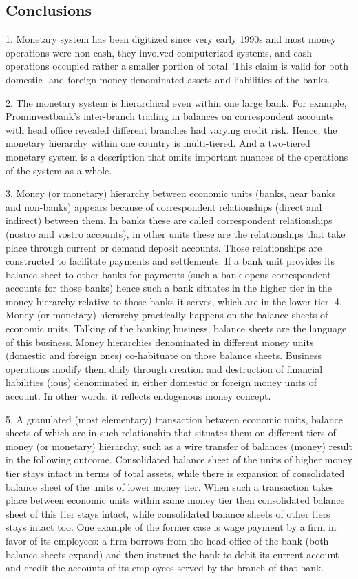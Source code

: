 \subsection{Conclusions}

1. Monetary system has been digitized since very early 1990s and most money operations were non-cash, they involved computerized systems, and cash operations occupied rather a smaller portion of total. This claim is valid for both domestic- and foreign-money denominated assets and liabilities of the banks.

2. The monetary system is hierarchical even within one large bank. For example, Prominvestbank's inter-branch trading in balances on correspondent accounts with head office revealed different branches had varying credit risk. Hence, the monetary hierarchy within one country is multi-tiered. And a two-tiered monetary system is a description that omits important nuances of the operations of the system as a whole.

3. Money (or monetary) hierarchy between economic units (banks, near banks and non-banks) appears because of correspondent relationships (direct and indirect) between them. In banks these are called correspondent relationships (nostro and vostro accounts), in other units these are the relationships that take place through current or demand deposit accounts. Those relationships are constructed to facilitate payments and settlements. If a bank unit provides its balance sheet to other banks for payments (such a bank opens correspondent accounts for those banks) hence such a bank situates in the higher tier in the money hierarchy relative to those banks it serves, which are in the lower tier.
4. Money (or monetary) hierarchy practically happens on the balance sheets of economic units. Talking of the banking business, balance sheets are the language of this business. Money hierarchies denominated in different money units (domestic and foreign ones) co-habituate on those balance sheets. Business operations modify them daily through creation and destruction of financial liabilities (\acsp{iou}) denominated in either domestic or foreign money units of account. In other words, it reflects endogenous money concept.

5. A granulated (most elementary) transaction between economic units, balance sheets of which are in such relationship that situates them on different tiers of money  (or monetary) hierarchy, such as a wire transfer of balances (money) result in the following outcome. Consolidated balance sheet of the units of higher money tier stays intact in terms of total assets, while there is expansion of consolidated balance sheet of the units of lower money tier. When such a transaction takes place between economic units within same money tier then consolidated balance sheet of this tier stays intact, while consolidated balance sheets of other tiers stays intact too. One example of the former case is wage payment by a firm in favor of its employees: a firm borrows from the head office of the bank (both balance sheets expand) and then instruct the bank to debit its current account and credit the accounts of its employees served by the branch of that bank.

